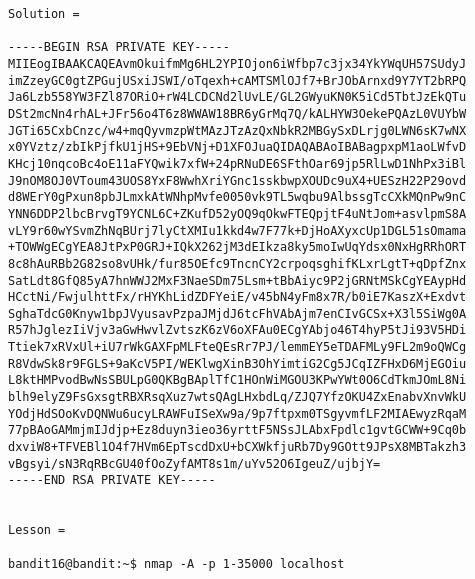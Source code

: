 \documentclass[a4paper]{report}
\begin{document}
\begin{verbatim}
Solution = 

-----BEGIN RSA PRIVATE KEY-----
MIIEogIBAAKCAQEAvmOkuifmMg6HL2YPIOjon6iWfbp7c3jx34YkYWqUH57SUdyJ
imZzeyGC0gtZPGujUSxiJSWI/oTqexh+cAMTSMlOJf7+BrJObArnxd9Y7YT2bRPQ
Ja6Lzb558YW3FZl87ORiO+rW4LCDCNd2lUvLE/GL2GWyuKN0K5iCd5TbtJzEkQTu
DSt2mcNn4rhAL+JFr56o4T6z8WWAW18BR6yGrMq7Q/kALHYW3OekePQAzL0VUYbW
JGTi65CxbCnzc/w4+mqQyvmzpWtMAzJTzAzQxNbkR2MBGySxDLrjg0LWN6sK7wNX
x0YVztz/zbIkPjfkU1jHS+9EbVNj+D1XFOJuaQIDAQABAoIBABagpxpM1aoLWfvD
KHcj10nqcoBc4oE11aFYQwik7xfW+24pRNuDE6SFthOar69jp5RlLwD1NhPx3iBl
J9nOM8OJ0VToum43UOS8YxF8WwhXriYGnc1sskbwpXOUDc9uX4+UESzH22P29ovd
d8WErY0gPxun8pbJLmxkAtWNhpMvfe0050vk9TL5wqbu9AlbssgTcCXkMQnPw9nC
YNN6DDP2lbcBrvgT9YCNL6C+ZKufD52yOQ9qOkwFTEQpjtF4uNtJom+asvlpmS8A
vLY9r60wYSvmZhNqBUrj7lyCtXMIu1kkd4w7F77k+DjHoAXyxcUp1DGL51sOmama
+TOWWgECgYEA8JtPxP0GRJ+IQkX262jM3dEIkza8ky5moIwUqYdsx0NxHgRRhORT
8c8hAuRBb2G82so8vUHk/fur85OEfc9TncnCY2crpoqsghifKLxrLgtT+qDpfZnx
SatLdt8GfQ85yA7hnWWJ2MxF3NaeSDm75Lsm+tBbAiyc9P2jGRNtMSkCgYEAypHd
HCctNi/FwjulhttFx/rHYKhLidZDFYeiE/v45bN4yFm8x7R/b0iE7KaszX+Exdvt
SghaTdcG0Knyw1bpJVyusavPzpaJMjdJ6tcFhVAbAjm7enCIvGCSx+X3l5SiWg0A
R57hJglezIiVjv3aGwHwvlZvtszK6zV6oXFAu0ECgYAbjo46T4hyP5tJi93V5HDi
Ttiek7xRVxUl+iU7rWkGAXFpMLFteQEsRr7PJ/lemmEY5eTDAFMLy9FL2m9oQWCg
R8VdwSk8r9FGLS+9aKcV5PI/WEKlwgXinB3OhYimtiG2Cg5JCqIZFHxD6MjEGOiu
L8ktHMPvodBwNsSBULpG0QKBgBAplTfC1HOnWiMGOU3KPwYWt0O6CdTkmJOmL8Ni
blh9elyZ9FsGxsgtRBXRsqXuz7wtsQAgLHxbdLq/ZJQ7YfzOKU4ZxEnabvXnvWkU
YOdjHdSOoKvDQNWu6ucyLRAWFuISeXw9a/9p7ftpxm0TSgyvmfLF2MIAEwyzRqaM
77pBAoGAMmjmIJdjp+Ez8duyn3ieo36yrttF5NSsJLAbxFpdlc1gvtGCWW+9Cq0b
dxviW8+TFVEBl1O4f7HVm6EpTscdDxU+bCXWkfjuRb7Dy9GOtt9JPsX8MBTakzh3
vBgsyi/sN3RqRBcGU40fOoZyfAMT8s1m/uYv52O6IgeuZ/ujbjY=
-----END RSA PRIVATE KEY-----


Lesson = 

bandit16@bandit:~$ nmap -A -p 1-35000 localhost


\end{verbatim}
\end{document}

